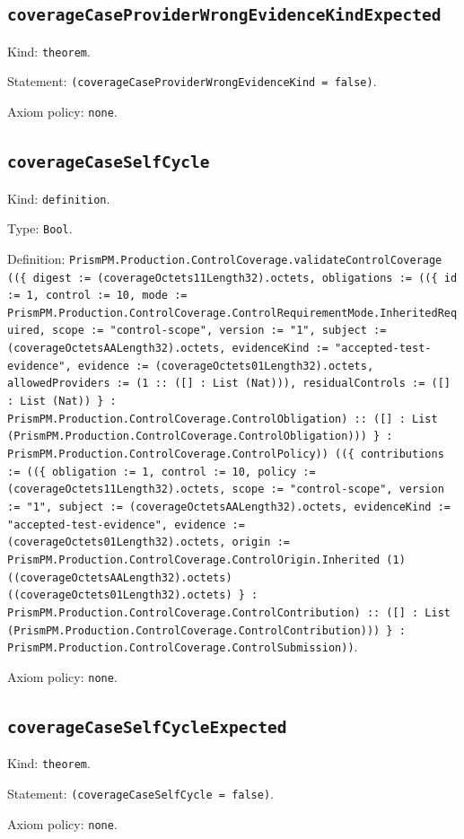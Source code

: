 \documentclass[11pt]{article}
\begin{document}
\subsection*{\texttt{coverageCaseProviderWrongEvidenceKindExpected}}
\noindent Kind: \texttt{theorem}.\par
\noindent Statement: \texttt{(coverageCaseProviderWrongEvidenceKind = false)}.\par
\noindent Axiom policy: \texttt{none}.\par
\subsection*{\texttt{coverageCaseSelfCycle}}
\noindent Kind: \texttt{definition}.\par
\noindent Type: \texttt{Bool}.\par
\noindent Definition: \texttt{PrismPM.Production.ControlCoverage.validateControlCoverage ((\{ digest := (coverageOctets11Length32).octets, obligations := ((\{ id := 1, control := 10, mode := PrismPM.Production.ControlCoverage.ControlRequirementMode.InheritedRequired, scope := "control-scope", version := "1", subject := (coverageOctetsAALength32).octets, evidenceKind := "accepted-test-evidence", evidence := (coverageOctets01Length32).octets, allowedProviders := (1 :: ([] : List (Nat))), residualControls := ([] : List (Nat)) \} : PrismPM.Production.ControlCoverage.ControlObligation) :: ([] : List (PrismPM.Production.ControlCoverage.ControlObligation))) \} : PrismPM.Production.ControlCoverage.ControlPolicy)) ((\{ contributions := ((\{ obligation := 1, control := 10, policy := (coverageOctets11Length32).octets, scope := "control-scope", version := "1", subject := (coverageOctetsAALength32).octets, evidenceKind := "accepted-test-evidence", evidence := (coverageOctets01Length32).octets, origin := PrismPM.Production.ControlCoverage.ControlOrigin.Inherited (1) ((coverageOctetsAALength32).octets) ((coverageOctets01Length32).octets) \} : PrismPM.Production.ControlCoverage.ControlContribution) :: ([] : List (PrismPM.Production.ControlCoverage.ControlContribution))) \} : PrismPM.Production.ControlCoverage.ControlSubmission))}.\par
\noindent Axiom policy: \texttt{none}.\par
\subsection*{\texttt{coverageCaseSelfCycleExpected}}
\noindent Kind: \texttt{theorem}.\par
\noindent Statement: \texttt{(coverageCaseSelfCycle = false)}.\par
\noindent Axiom policy: \texttt{none}.\par
\end{document}
